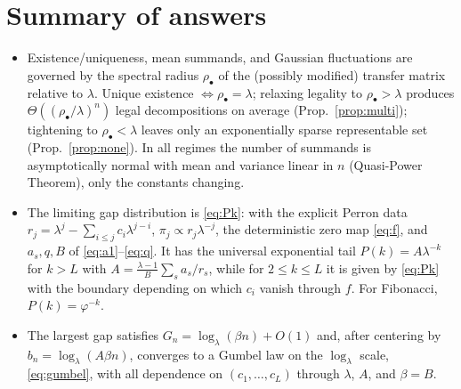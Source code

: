 \documentclass[12pt]{article}
\theoremstyle{definition}
\begin{document}
\section*{Summary of answers}
\begin{itemize}
\item[(a)] Existence/uniqueness, mean summands, and Gaussian fluctuations are
governed by the spectral radius $\rho_\bullet$ of the (possibly modified)
transfer matrix relative to $\lambda$. Unique existence $\Leftrightarrow
\rho_\bullet=\lambda$; relaxing legality to $\rho_\bullet>\lambda$ produces
$\Theta((\rho_\bullet/\lambda)^n)$ legal decompositions on average
(Prop.~\ref{prop:multi}); tightening to $\rho_\bullet<\lambda$ leaves only an
exponentially sparse representable set (Prop.~\ref{prop:none}). In all regimes
the number of summands is asymptotically normal with mean and variance linear in
$n$ (Quasi-Power Theorem), only the constants changing.
\item[(b)] The limiting gap distribution is \eqref{eq:Pk}: with the explicit
Perron data $r_j=\lambda^j-\sum_{i\le j}c_i\lambda^{j-i}$, $\pi_j\propto
r_j\lambda^{-j}$, the deterministic zero map \eqref{eq:f}, and
$a_s,q,B$ of \eqref{eq:a1}--\eqref{eq:q}. It has the universal exponential tail
$P(k)=A\lambda^{-k}$ for $k>L$ with $A=\frac{\lambda-1}{B}\sum_s a_s/r_s$, while
for $2\le k\le L$ it is given by \eqref{eq:Pk} with the boundary depending on
which $c_i$ vanish through $f$. For Fibonacci, $P(k)=\varphi^{-k}$.
\item[(c)] The largest gap satisfies $G_n=\log_\lambda(\beta n)+O(1)$ and, after
centering by $b_n=\log_\lambda(A\beta n)$, converges to a Gumbel law on the
$\log_\lambda$ scale, \eqref{eq:gumbel}, with all dependence on
$(c_1,\dots,c_L)$ through $\lambda$, $A$, and $\beta=B$.
\end{itemize}
\end{document}
